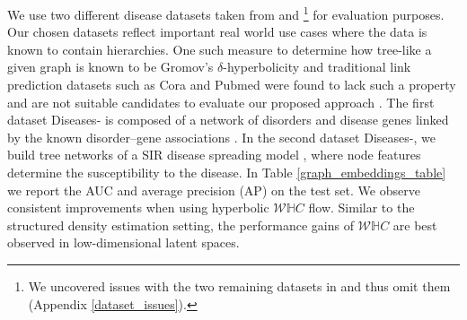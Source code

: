 We use two different disease datasets taken from \citep{chami2019hyperbolic} and \citep{mathieu2019continuous}\footnote{We uncovered issues with the two remaining datasets in \cite{mathieu2019continuous} and thus omit them (Appendix \ref{dataset_issues}).} for evaluation purposes. Our chosen datasets reflect important real world use cases where the data is known to contain hierarchies. One such measure to determine how tree-like a given graph is known to be Gromov’s $\delta$-hyperbolicity and traditional link prediction datasets such as Cora and Pubmed \cite{yang2016revisiting} were found to lack such a property and are not suitable candidates to evaluate our proposed approach \cite{chami2019hyperbolic}. The first dataset Diseases- is composed of a network of disorders and disease genes linked by the known disorder–gene associations \cite{goh2007human}. In the second dataset Diseases-, we build tree networks of a SIR disease spreading model \cite{anderson1992infectious}, where node features determine the susceptibility to the disease. In Table \ref{graph_embeddings_table} we report the AUC and average precision (AP) on the test set.
We observe consistent improvements when using hyperbolic $\mathcal{W}\mathbb{H}C$ flow. Similar to the structured density estimation setting, the performance gains of $\mathcal{W}\mathbb{H}C$ are best observed in low-dimensional latent spaces.

